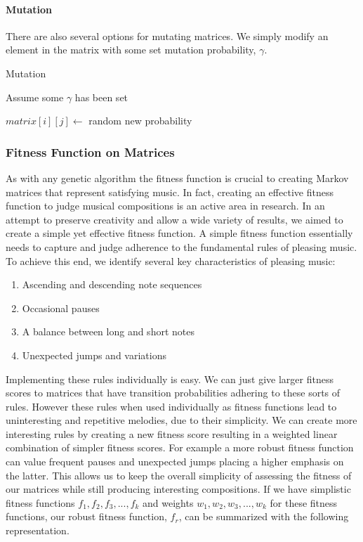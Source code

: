\documentclass{article}
\begin{document}
\paragraph{Mutation} There are also several options for mutating matrices. We simply modify an element in the matrix with some set mutation probability, $\gamma$.

\begin{algorithm}[H]
  \caption{Mutation}
  \begin{algorithmic}
    \State Assume some $\gamma$ has been set

    \State $matrix[i][j] \gets $ random new probability
    \EndIf
    \EndWhile
    \EndWhile
  \end{algorithmic}
\end{algorithm}


\subsubsection{Fitness Function on Matrices}

As with any genetic algorithm the fitness function is crucial to creating Markov matrices that represent satisfying music. In fact, creating an effective fitness function to judge musical compositions is an active area in research. In an attempt to preserve creativity and allow a wide variety of results, we aimed to create a simple yet effective fitness function. A simple fitness function essentially needs to capture and judge adherence to the fundamental rules of pleasing music. To achieve this end, we identify several key characteristics of pleasing music:

\begin{enumerate}
\item Ascending and descending note sequences
\item Occasional pauses
\item A balance between long and short notes
\item Unexpected jumps and variations
\end{enumerate}

Implementing these rules individually is easy. We can just give larger fitness scores to matrices that have transition probabilities adhering to these sorts of rules. However these rules when used individually as fitness functions lead to uninteresting and repetitive melodies, due to their simplicity. We can create more interesting rules by creating a new fitness score resulting in a weighted linear combination of simpler fitness scores. For example a more robust fitness function can value frequent pauses and unexpected jumps placing a higher emphasis on the latter.  This allows us to keep the overall simplicity of assessing the fitness of our matrices while still producing interesting compositions. If we have simplistic fitness functions $f_1, f_2, f_3, ..., f_k$ and weights $w_1, w_2, w_3, ..., w_k$ for these fitness functions, our robust fitness function, $f_r$, can be summarized with the following representation.
\end{document}
